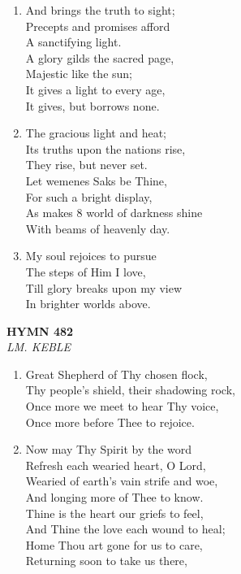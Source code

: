 \documentclass[11pt,a4paper]{article}
\begin{document}
\begin{enumerate}
    \item And brings the truth to sight; \\
        Precepts and promises afford \\
        A sanctifying light. \\
        A glory gilds the sacred page, \\
        Majestic like the sun; \\
        It gives a light to every age, \\
        It gives, but borrows none.

    \item The gracious light and heat; \\
        Its truths upon the nations rise, \\
        They rise, but never set. \\
        Let wemenes Saks be Thine, \\
        For such a bright display, \\
        As makes 8 world of darkness shine \\
        With beams of heavenly day.

    \item My soul rejoices to pursue \\
        The steps of Him I love, \\
        Till glory breaks upon my view \\
        In brighter worlds above.

\end{enumerate}

\newpage
\begin{center}
    {\Large \textbf{HYMN 482}}
    \\
    \textit{LM. KEBLE}
\end{center}
\vspace{1em}

\begin{enumerate}
    \item Great Shepherd of Thy chosen flock, \\
        Thy people's shield, their shadowing rock, \\
        Once more we meet to hear Thy voice, \\
        Once more before Thee to rejoice.

    \item Now may Thy Spirit by the word \\
        Refresh each wearied heart, O Lord, \\
        Wearied of earth's vain strife and woe, \\
        And longing more of Thee to know. \\
        Thine is the heart our griefs to feel, \\
        And Thine the love each wound to heal; \\
        Home Thou art gone for us to care, \\
        Returning soon to take us there,

\end{enumerate}
\end{document}
